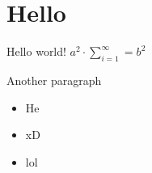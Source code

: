 \documentclass[12pt]{extarticle}
\begin{document}
\tableofcontents\newpage

\section{Hello}
Hello world! $a^{2}\cdot\sum\limits_{i=1}^{\infty}=b^{2}$
\par Another paragraph

\begin{itemize}
	\item He
	\item xD
	\item lol
\end{itemize}
\end{document}
